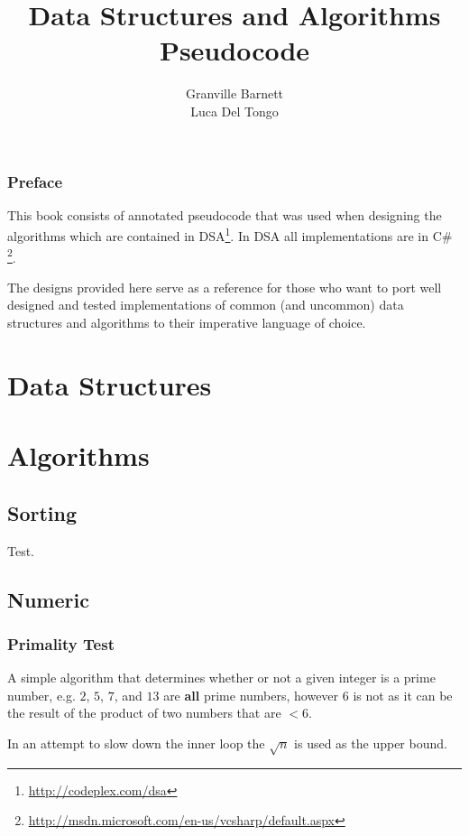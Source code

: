 \documentclass[10pt,oneside,a4paper]{report}
\begin{document}
\title{Data Structures and Algorithms\\Pseudocode}
\author{Granville Barnett\\Luca Del Tongo}
\maketitle

\newpage
\tableofcontents
\newpage

\section*{Preface}
This book consists of annotated pseudocode that was used when designing the algorithms which are contained in DSA\footnote{\url{http://codeplex.com/dsa}}. In DSA all implementations are in C\# \footnote{\url{http://msdn.microsoft.com/en-us/vcsharp/default.aspx}}.

The designs provided here serve as a reference for those who want to port well designed and tested implementations of common (and uncommon) data structures and algorithms to their imperative language of choice.

\pagestyle{headings}

\part{Data Structures}

\part{Algorithms}

\chapter{Sorting}
Test.

\chapter{Numeric}
\section{Primality Test} \label{cha:Primality}
A simple algorithm that determines whether or not a given integer is a prime number, e.g. $2$, $5$, $7$, and $13$ are \textbf{all} prime numbers, however $6$ is not as it can be the result of the product of two numbers that are $< 6$.

In an attempt to slow down the inner loop the $\sqrt{n}$ is used as the upper bound.
\end{document}
